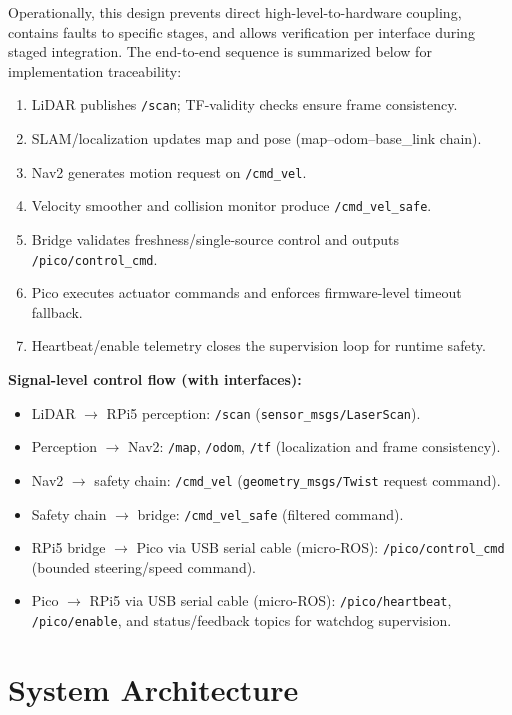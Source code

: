 \documentclass[12pt,a4paper]{report}
\begin{document}
Operationally, this design prevents direct high-level-to-hardware coupling, contains faults to specific stages, and allows verification per interface during staged integration. The end-to-end sequence is summarized below for implementation traceability:
\begin{enumerate}[label=\textbf{Step \arabic*:}, leftmargin=2.2cm]
    \item LiDAR publishes \texttt{/scan}; TF-validity checks ensure frame consistency.
    \item SLAM/localization updates map and pose (map--odom--base\_link chain).
    \item Nav2 generates motion request on \texttt{/cmd\_vel}.
    \item Velocity smoother and collision monitor produce \texttt{/cmd\_vel\_safe}.
    \item Bridge validates freshness/single-source control and outputs \texttt{/pico/control\_cmd}.
    \item Pico executes actuator commands and enforces firmware-level timeout fallback.
    \item Heartbeat/enable telemetry closes the supervision loop for runtime safety.
\end{enumerate}

\textbf{Signal-level control flow (with interfaces):}
\begin{itemize}
    \item LiDAR $\rightarrow$ RPi5 perception: \texttt{/scan} (\texttt{sensor\_msgs/LaserScan}).
    \item Perception $\rightarrow$ Nav2: \texttt{/map}, \texttt{/odom}, \texttt{/tf} (localization and frame consistency).
    \item Nav2 $\rightarrow$ safety chain: \texttt{/cmd\_vel} (\texttt{geometry\_msgs/Twist} request command).
    \item Safety chain $\rightarrow$ bridge: \texttt{/cmd\_vel\_safe} (filtered command).
    \item RPi5 bridge $\rightarrow$ Pico via USB serial cable (micro-ROS): \texttt{/pico/control\_cmd} (bounded steering/speed command).
    \item Pico $\rightarrow$ RPi5 via USB serial cable (micro-ROS): \texttt{/pico/heartbeat}, \texttt{/pico/enable}, and status/feedback topics for watchdog supervision.
\end{itemize}

\section{System Architecture}
\end{document}
